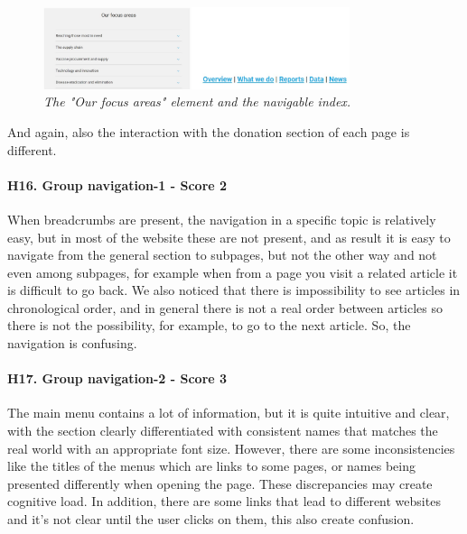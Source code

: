 \begin{figure}[!h]
	\begin{center}
		\includegraphics[width=0.8\textwidth]{FinalScores19.jpg}
		\captionsetup{font=small}
		\caption{\textit{The "Our focus areas" element and the navigable index.}}
	\end{center}
\end{figure}
\newline And again, also the interaction with the donation section of each page is different.
\newline
\newline \paragraph{H16. Group navigation-1 - Score 2}	When breadcrumbs are present, the navigation in a specific topic is relatively easy, but in most of the website these are not present, and as result it is easy to navigate from the general section to subpages, but not the other way and not even among subpages, for example when from a page you visit a related article it is difficult to go back.
\newline We also noticed that there is impossibility to see articles in chronological order, and in general there is not a real order between articles so there is not the possibility, for example, to go to the next article.
\newline So, the navigation is confusing.
\newline
\newline \paragraph{H17. Group navigation-2 - Score 3}	The main menu contains a lot of information, but it is quite intuitive and clear, with the section clearly differentiated with consistent names that matches the real world with an appropriate font size. However, there are some inconsistencies like the titles of the menus which are links to some pages, or names being presented differently when opening the page. These discrepancies may create cognitive load. 
\newline In addition, there are some links that lead to different websites and it’s not clear until the user clicks on them, this also create confusion.
